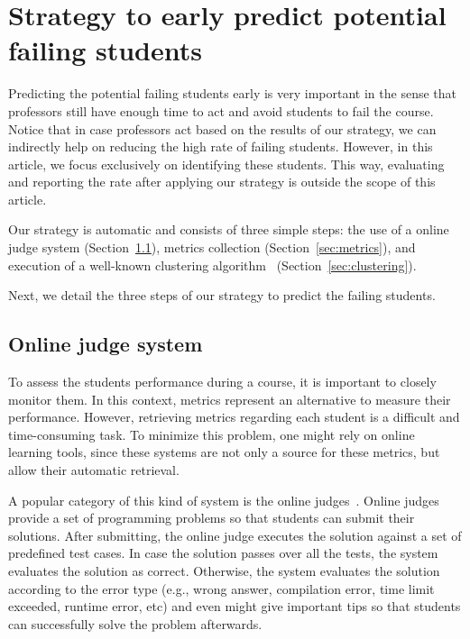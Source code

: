\section{Strategy to early predict potential failing students}

\label{sec:strategy}

Predicting the potential failing students early is very important in the sense that professors still have enough time to act and avoid students to fail the course. Notice that in case professors act based on the results of our strategy, we can indirectly help on reducing the high rate of failing students. However, in this article, we focus exclusively on identifying these students. This way, evaluating and reporting the rate after applying our strategy is outside the scope of this article.

Our strategy is automatic and consists of three simple steps: the use of a online judge system (Section~\ref{sec:online}), metrics collection (Section~\ref{sec:metrics}), and execution of a well-known clustering algorithm~\cite{hartigan-clustering-algorithms-1975} (Section~\ref{sec:clustering}).

Next, we detail the three steps of our strategy to predict the failing students.

\subsection{Online judge system}

\label{sec:online}

To assess the students performance during a course, it is important to closely monitor them. In this context, metrics represent an alternative to measure their performance. However, retrieving metrics regarding each student is a difficult and time-consuming task. To minimize this problem, one might rely on online learning tools, since these systems are not only a source for these metrics, but allow their automatic retrieval. 

A popular category of this kind of system is the online judges~\cite{uva, sphere}. Online judges provide a set of programming problems so that students can submit their solutions. After submitting, the online judge executes the solution against a set of predefined test cases. In case the solution passes over all the tests, the system evaluates the solution as correct. Otherwise, the system evaluates the solution according to the error type (e.g., wrong answer, compilation error, time limit exceeded, runtime error, etc) and even might give important tips so that students can successfully solve the problem afterwards.

